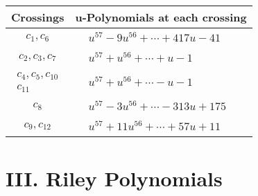 \documentclass[1p]{elsarticle_modified}
\theoremstyle{definition}
\begin{document}
\begin{tabular}{m{50pt}|m{274pt}}
Crossings & \hspace{64pt}u-Polynomials at each crossing \\
\hline $$\begin{aligned}c_{1},c_{6}\end{aligned}$$&$\begin{aligned}
&u^{57}-9 u^{56}+\cdots+417 u-41
\end{aligned}$\\
\hline $$\begin{aligned}c_{2},c_{3},c_{7}\end{aligned}$$&$\begin{aligned}
&u^{57}+u^{56}+\cdots+u-1
\end{aligned}$\\
\hline $$\begin{aligned}c_{4},c_{5},c_{10}\\c_{11}\end{aligned}$$&$\begin{aligned}
&u^{57}+u^{56}+\cdots- u-1
\end{aligned}$\\
\hline $$\begin{aligned}c_{8}\end{aligned}$$&$\begin{aligned}
&u^{57}-3 u^{56}+\cdots-313 u+175
\end{aligned}$\\
\hline $$\begin{aligned}c_{9},c_{12}\end{aligned}$$&$\begin{aligned}
&u^{57}+11 u^{56}+\cdots+57 u+11
\end{aligned}$\\
\hline
\end{tabular}\newpage\renewcommand{\arraystretch}{1}
\centering \section*{ III. Riley Polynomials}
\end{document}
